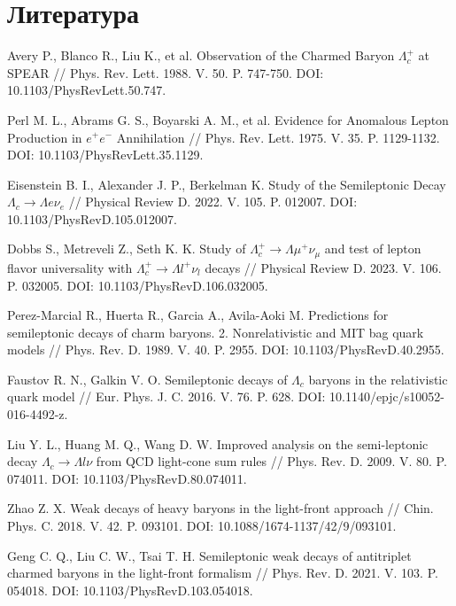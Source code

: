\section{Литература}

\begin{thebibliography}{99}

    Avery P., Blanco R., Liu K., et al. Observation of the Charmed Baryon $\Lambda^+_c$ at SPEAR // Phys. Rev. Lett. 1988. V. 50. P. 747-750. DOI: 10.1103/PhysRevLett.50.747.
    
    Perl M. L., Abrams G. S., Boyarski A. M., et al. Evidence for Anomalous Lepton Production in $e^+e^-$ Annihilation // Phys. Rev. Lett. 1975. V. 35. P. 1129-1132. DOI: 10.1103/PhysRevLett.35.1129.
    
    Eisenstein B. I., Alexander J. P., Berkelman K. Study of the Semileptonic Decay $\Lambda_c \rightarrow \Lambda e \nu_e$ // Physical Review D. 2022. V. 105. P. 012007. DOI: 10.1103/PhysRevD.105.012007.
    
    Dobbs S., Metreveli Z., Seth K. K. Study of $\Lambda_c^+ \rightarrow \Lambda \mu^+ \nu_{\mu}$ and test of lepton flavor universality with $\Lambda_c^+ \rightarrow \Lambda l^+ \nu_l$ decays // Physical Review D. 2023. V. 106. P. 032005. DOI: 10.1103/PhysRevD.106.032005.
    
    Perez-Marcial R., Huerta R., Garcia A., Avila-Aoki M. Predictions for semileptonic decays of charm baryons. 2. Nonrelativistic and MIT bag quark models // Phys. Rev. D. 1989. V. 40. P. 2955. DOI: 10.1103/PhysRevD.40.2955.
    
    Faustov R. N., Galkin V. O. Semileptonic decays of $\Lambda_c$ baryons in the relativistic quark model // Eur. Phys. J. C. 2016. V. 76. P. 628. DOI: 10.1140/epjc/s10052-016-4492-z.
    
    Liu Y. L., Huang M. Q., Wang D. W. Improved analysis on the semi-leptonic decay $\Lambda_c \to \Lambda l \nu$ from QCD light-cone sum rules // Phys. Rev. D. 2009. V. 80. P. 074011. DOI: 10.1103/PhysRevD.80.074011.
    
    Zhao Z. X. Weak decays of heavy baryons in the light-front approach // Chin. Phys. C. 2018. V. 42. P. 093101. DOI: 10.1088/1674-1137/42/9/093101.
    
    Geng C. Q., Liu C. W., Tsai T. H. Semileptonic weak decays of antitriplet charmed baryons in the light-front formalism // Phys. Rev. D. 2021. V. 103. P. 054018. DOI: 10.1103/PhysRevD.103.054018.
    

\end{thebibliography}
